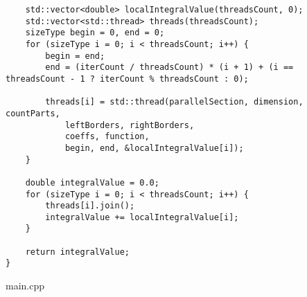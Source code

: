 \documentclass{report}
\begin{document}
\begin{lstlisting}
    std::vector<double> localIntegralValue(threadsCount, 0);
    std::vector<std::thread> threads(threadsCount);
    sizeType begin = 0, end = 0;
    for (sizeType i = 0; i < threadsCount; i++) {
        begin = end;
        end = (iterCount / threadsCount) * (i + 1) + (i == threadsCount - 1 ? iterCount % threadsCount : 0);

        threads[i] = std::thread(parallelSection, dimension, countParts,
            leftBorders, rightBorders,
            coeffs, function,
            begin, end, &localIntegralValue[i]);
    }

    double integralValue = 0.0;
    for (sizeType i = 0; i < threadsCount; i++) {
        threads[i].join();
        integralValue += localIntegralValue[i];
    }

    return integralValue;
}

\end{lstlisting}
main.cpp
\end{document}

